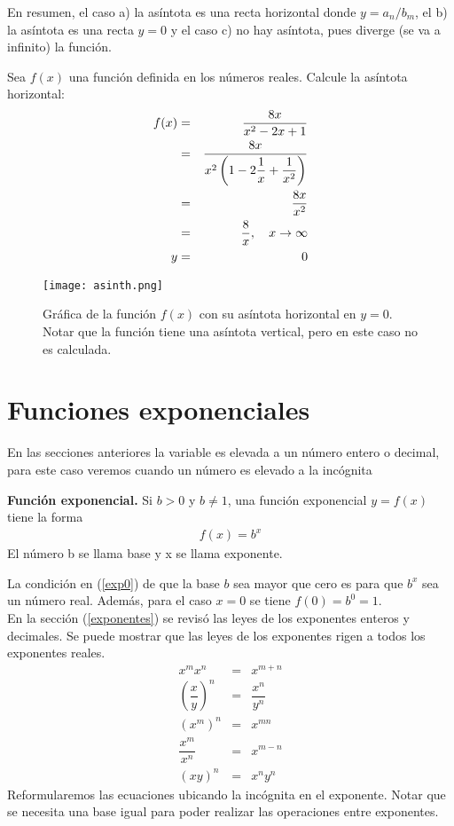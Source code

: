 En resumen, el caso a) la asíntota es una recta horizontal donde $y= a_{n}/b_{m}$, el b) la asíntota es una recta $y=0$ y el caso c) no hay asíntota, pues diverge (se va a infinito) la función.
\begin{myexample}
Sea $f(x)$ una función definida en los números reales. Calcule la asíntota horizontal:
\begin{eqnarray*}
f(x)&=&\dfrac{8x}{x^{2}-2x+1}\\
&=&\dfrac{8x}{x^{2}\left(1-2\dfrac{1}{x}+\dfrac{1}{x^{2}}\right) }\\
&=&\dfrac{8x}{x^{2} }\\
&=&\dfrac{8}{x}, \hspace{10px} x\rightarrow \infty\\
y &=& 0 
\end{eqnarray*}

 \begin{center}
\begin{figure}[h!]
\centering
\texttt{[image: asinth.png]}
\caption[Gráfica de la función $f(x)$ con su asíntota horizontal en $y=0$.]{Gráfica de la función $f(x)$ con su asíntota horizontal en $y=0$. Notar que la función tiene una asíntota vertical, pero en este caso no es calculada.} \label{asintvert1}
\end{figure}
\end{center}
\end{myexample}

\section{Funciones exponenciales}
En las secciones anteriores la variable es elevada a un número entero o decimal, para este caso veremos cuando un número es  elevado a la incógnita
\begin{mydef}
\textbf{Función exponencial.} Si $b>0$ y $b\neq 1$, una función exponencial $y=f(x)$ tiene la forma\\
\begin{eqnarray}
f(x)=b^{x}
\label{exp0}
\end{eqnarray}
El número b se llama base y x se llama exponente.
\end{mydef}
La condición en (\ref{exp0}) de que la base $b$ sea mayor que cero es para que $b^{x}$ sea un número real. Además, para el caso $x=0$ se tiene $f(0)=b^{0}=1$.\\

En la sección (\ref{exponentes}) se revisó las leyes de los exponentes enteros y decimales. Se puede mostrar que las leyes de los exponentes rigen a todos los exponentes reales. 
\begin{eqnarray}
x^{m}x^{n}&=&x^{m+n}\\
\left(\dfrac{x}{y}\right)^{n}&=&\dfrac{x^{n}}{y^{n}}\\
(x^{m})^{n}&=&x^{mn}\\
\dfrac{x^{m}}{x^{n}}&=&x^{m-n}\\
(xy)^{n}&=&x^{n}y^{n}
\end{eqnarray}
Reformularemos las ecuaciones ubicando la incógnita en el exponente. Notar que se necesita una base igual para poder realizar las operaciones entre exponentes. 

